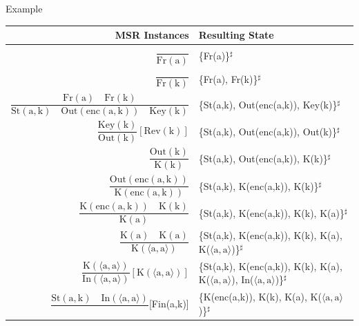 \documentclass[11pt,aspectratio=169]{beamer}
\begin{document}
\begin{frame}[fragile]{Example}
    \begin{table}[]
        \tiny
        \vspace*{-.5cm}
        \begin{tabular}{rl}
            \textbf{MSR Instances} & \textbf{Resulting State} \\
            \toprule
            $\mathrm{\dfrac{}{Fr(a)}}$
                & \{Fr(a)\}$^{\sharp}$ \\
            \midrule
            $\mathrm{\dfrac{}{Fr(k)}}$
                & \{Fr(a), Fr(k)\}$^{\sharp}$ \\
            \midrule
            $\mathrm{\dfrac{Fr(a)\quad Fr(k)}{St(a,k)\quad Out(enc(a,k))\quad Key(k)}}$
                & \{St(a,k), Out(enc(a,k)), Key(k)\}$^{\sharp}$ \\
            \midrule
            $\mathrm{\dfrac{Key(k)}{Out(k)}[Rev(k)]}$
                & \{St(a,k), Out(enc(a,k)), Out(k)\}$^{\sharp}$ \\
            \midrule
            $\mathrm{\dfrac{Out(k)}{K(k)}}$
                & \{St(a,k), Out(enc(a,k)), K(k)\}$^{\sharp}$ \\
            \midrule
            $\mathrm{\dfrac{Out(enc(a,k))}{K(enc(a,k))}}$
                & \{St(a,k), K(enc(a,k)), K(k)\}$^{\sharp}$ \\
            \midrule
            $\mathrm{\dfrac{K(enc(a,k))\quad K(k)}{K(a)}}$
                & \{St(a,k), K(enc(a,k)), K(k), K(a)\}$^{\sharp}$ \\
            \midrule
            $\mathrm{\dfrac{K(a)\quad K(a)}{K(\langle a,a \rangle)}}$
                & \{St(a,k), K(enc(a,k)), K(k), K(a), K($\langle \mathrm{a,a} \rangle$)\}$^{\sharp}$ \\
            \midrule
            $\mathrm{\dfrac{K(\langle a,a \rangle)}{In(\langle a,a \rangle)}[K(\langle a,a \rangle)]}$
                & \{St(a,k), K(enc(a,k)), K(k), K(a), K($\langle \mathrm{a,a} \rangle$), In($\langle \mathrm{a,a} \rangle$)\}$^{\sharp}$ \\
            \midrule
            $\mathrm{\dfrac{St(a,k)\quad In(\langle a,a \rangle)}{}}$[Fin(a,k)]
                & \{K(enc(a,k)), K(k), K(a), K($\langle \mathrm{a,a} \rangle$)\}$^{\sharp}$ \\
            \bottomrule
        \end{tabular}
    \end{table}
\end{frame}
\end{document}
